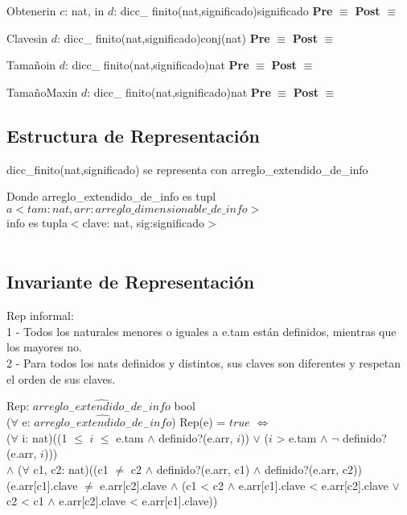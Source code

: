 	\begin{interfaz}{Obtener}{in $c$: nat, in $d$: dicc\_ finito(nat,significado)}{significado}{}
	\textbf{Pre} $\equiv$
	\textbf{Post} $\equiv$
	\end{interfaz}
	
	\begin{interfaz}{Claves}{in $d$: dicc\_ finito(nat,significado)}{conj(nat)}{}
	\textbf{Pre} $\equiv$
	\textbf{Post} $\equiv$
	\end{interfaz}
	
	\begin{interfaz}{Tama\~no}{in $d$: dicc\_ finito(nat,significado)}{nat}{}
	\textbf{Pre} $\equiv$
	\textbf{Post} $\equiv$
	\end{interfaz}

	\begin{interfaz}{Tama\~noMax}{in $d$: dicc\_ finito(nat,significado)}{nat}{}
	\textbf{Pre} $\equiv$
	\textbf{Post} $\equiv$
	\end{interfaz}
	

\subsection{Estructura de Representaci\'on}
dicc\_finito(nat,significado) se representa con arreglo\_extendido\_de\_info

Donde arreglo\_extendido\_de\_info es tupl$a<tam:nat, arr: arreglo\_dimensionable\_de\_info>$  \\ info es tupla$<$clave: nat, sig:significado$>$ \\\\



\subsection{Invariante de Representaci\'on}
	Rep informal:\\
	1 - Todos los naturales menores o iguales a e.tam est\'an definidos, mientras que los mayores no.\\
	2 - Para todos los nats definidos y distintos, sus claves son diferentes y respetan el orden de sus claves.

	\noindent Rep: $\widehat{arreglo_-extendido_-de_-info}$ \en bool\\
	($\forall$ e: $\widehat{arreglo_-extendido_-de_-info}$) Rep(e) = $ true$ $\Leftrightarrow$ \\
	($\forall$ i: nat)((1 $\leq$ $i$ $\leq$ e.tam $\wedge$ definido?(e.arr, $i$)) $\vee$ ($i$ > e.tam $\wedge$ $\neg$ definido?(e.arr, $i$)))\\
	$\wedge$
	($\forall$ c1, c2: nat)((c1 $\neq$ c2  $\wedge$ definido?(e.arr, c1) $\wedge$ definido?(e.arr, c2))\impluego (e.arr[c1].clave $\neq$ e.arr[c2].clave $\wedge$ (c1 < c2 $\wedge$ e.arr[c1].clave <  e.arr[c2].clave $\vee$ c2 < c1 $\wedge$ e.arr[c2].clave <  e.arr[c1].clave))\\
	\\
